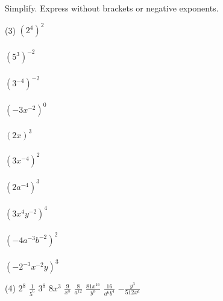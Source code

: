 \documentclass[12pt,fleqn]{book}
\newcommand{\prb}[1]{\begin{Exercise}#1\end{Exercise}}
\newcommand{\sol}[1]{\begin{Answer}#1\end{Answer}}
\begin{document}
\prb{Simplify. Express without brackets or negative exponents.\\
    \begin{tasks}(3)
        \task $\left(2^{4}\right)^{2}$\\
        \\[1in]
        \task $\left(5^{3}\right)^{-2}$\\
        \\[1in]
        \task $\left(3^{-4}\right)^{-2}$\\
        \\[1in]
        \task $\left(-3 x^{-2}\right)^{0}$\\
        \\[1in]
        \task $(2 x)^{3}$\\
        \\[1in]
        \task $\left(3 x^{-4}\right)^{2}$\\
        \\[1in]
        \task $\left(2 a^{-4}\right)^{3}$\\
        \\[1in]
        \task $\left(3 x^{4} y^{-2}\right)^{4}$\\
        \\[1in]
        \task $\left(-4 a^{-3} b^{-2}\right)^{2}$\\
        \\[1in]
        \task $\left(-2^{-3} x^{-2} y\right)^{3}$
        \\[1in]
    \end{tasks}
}
\sol{
    \begin{tasks}(4)
\task $2^8$
\task $\frac{1}{5^6}$
\task $3^8$
\task 1
\task $8 x^3$
\task $\frac{9}{x^8}$
\task $\frac{8}{a^{12}}$
\task $\frac{81 x^{16}}{y^8}$
\task $\frac{16}{a^6 b^4}$
\task $-\frac{y^3}{512 x^6}$
\end{tasks}


}
\end{document}
